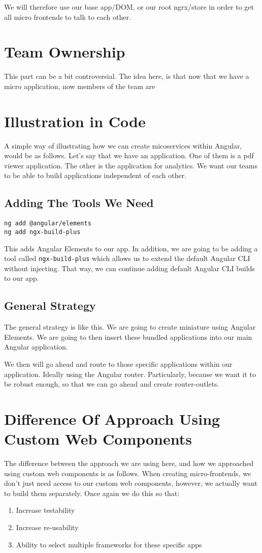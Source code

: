 We will therefore use our base app/DOM, or our root ngrx/store in order to get all micro frontends to talk to each other. 

\section{Team Ownership}
This part can be a bit controversial. The idea here, is that now that we have a micro application, now members of the team are 

\section{Illustration in Code}
A simple way of illustrating how we can create micoservices within Angular, would be as follows. Let's say that we have an application. One of them is a pdf viewer application. The other is the application for analytics. We want our teams to be able to build applications independent of each other. 

\subsection{Adding The Tools We Need}
\begin{verbatim}
ng add @angular/elements
ng add ngx-build-plus
\end{verbatim}

This adds Angular Elements to our app. In addition, we are going to be adding a tool called \lstinline{ngx-build-plus} which allows us to extend the default Angular CLI without injecting. That way, we can continue adding default Angular CLI builds to our app. 

\subsection{General Strategy}
The general strategy is like this. We are going to create miniature using Angular Elements. We are going to then insert these bundled applications into our main Angular application. 

We then will go ahead and route to those specific applications within our application. Ideally using the Angular router. Particularly, because we want it to be robust enough, so that we can go ahead and create router-outlets. 

\section{Difference Of Approach Using Custom Web Components}
The difference between the approach we are using here, and how we approached using custom web components is as follows. When creating micro-frontends, we don't just need access to our custom web components, however, we actually want to build them separately. Once again we do this so that: 
\begin{enumerate}
  \item Increase testability
  \item Increase re-usability
  \item Ability to select multiple frameworks for these specific apps
\end{enumerate}

